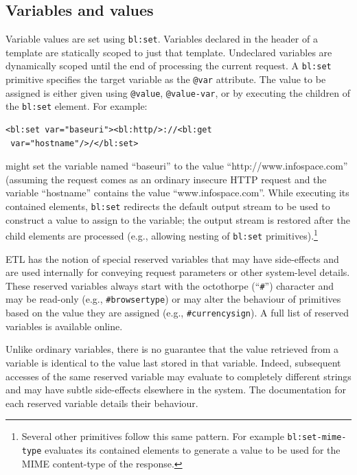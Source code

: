 \documentclass{www2003-submission}
\newcommand{\B}{\discretionary{}{}{}}
\newcommand{\smtexttt}[1]{{\small\texttt{#1}}}
\begin{document}
\subsection{Variables and values}
\label{ssec-variables}

Variable values are set using \smtexttt{bl:set}.  Variables
declared in the header of a template are statically scoped to just
that template.   Undeclared variables are dynamically scoped until the
end of processing the current request.  A \smtexttt{bl:set} primitive
specifies the target variable as the \smtexttt{@var} attribute. The
value to be assigned is either given using \smtexttt{@value},
\smtexttt{@value-var}, or by executing the children of the
\smtexttt{bl:set} element.  For example:

\begin{verbatim}
<bl:set var="baseuri"><bl:http/>://<bl:get
 var="hostname"/>/</bl:set>
\end{verbatim}

\noindent might set the variable named ``baseuri'' to the value
``http://www.\B{}infospace.\B{}com'' (assuming the request comes as an
ordinary insecure HTTP request and the variable ``hostname'' contains
the value ``www.infospace.com''.  While executing its contained
elements, \smtexttt{bl:set} redirects the default output stream to be
used to construct a value to assign to the variable; the output stream
is restored after the child elements are processed (e.g., allowing
nesting of \smtexttt{bl:set} primitives).\footnote{Several other
primitives follow this same pattern.  For example
\smtexttt{bl:set-mime-type} evaluates its contained elements to
generate a value to be used for the MIME content-type of the
response.}

ETL has the notion of special reserved variables that may have
side-effects and are used internally for conveying request parameters or
other system-level details.  These reserved variables always start with
the octothorpe (``\smtexttt{\#}'') character and may be read-only (e.g.,
\smtexttt{\#browsertype}) or may alter the behaviour of primitives based
on the value they are assigned (e.g., \smtexttt{\#currencysign}).  A
full list of reserved variables is available
online.~\cite{etl-reserved-variables}

Unlike ordinary variables, there is no guarantee that the value
retrieved from a variable is identical to the value last stored in that
variable.  Indeed, subsequent accesses of the same reserved
variable may evaluate to completely different strings and may have
subtle side-effects elsewhere in the system.  The documentation for each
reserved variable details their behaviour.
\end{document}

